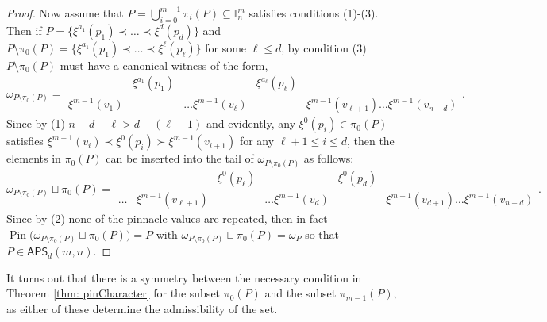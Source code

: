 \documentclass[12pt,reqno]{amsart}
\numberwithin{equation}{section}
\theoremstyle{plain}
\theoremstyle{definition}
\theoremstyle{remark}
\newcommand{\I}{\mathbb{I}}
\newcommand{\Pin}{\operatorname{Pin}}
\newcommand\APS{\mathsf{APS}}
\begin{document}
\begin{proof}
Now assume that $P=\bigcup_{i=0}^{m-1}\pi_i(P) \subseteq \I_n^m$ satisfies conditions (1)-(3).
Then if $P = \{ \xi^{a_1}(p_1)\prec \dots \prec \xi^{d}(p_d)\}$ and $P\setminus \pi_0(P) = \{ \xi^{a_1}(p_1)\prec \dots \prec \xi^{\ell}(p_{\ell})\}$ for some $\ell\leq d$, by condition (3) $P\setminus \pi_0(P)$ must have a canonical witness of the form, 
\begin{equation}\label{eq:smallwitness} 
\omega_{P\setminus\pi_0(P)}=\begin{matrix}&\xi^{a_1}(p_1)&&\xi^{a_\ell}(p_{\ell})\\
\xi^{m-1}(v_1)&& \dots \xi^{m-1}(v_{\ell})&& \xi^{m-1}(v_{\ell+1})\dots \xi^{m-1}(v_{n-d})
\end{matrix}. 
\end{equation}
Since by (1) $n-d-\ell > d-(\ell-1)$ and evidently, any $\xi^0(p_i) \in \pi_0(P)$ satisfies $\xi^{m-1}(v_i) \prec \xi^0(p_i) \succ \xi^{m-1}(v_{i+1})$ for any $\ell+1\leq i \leq d$, then the elements in $\pi_0(P)$ can be inserted into the tail of $\omega_{P\setminus\pi_0(P)}$ as follows: 
\begin{equation*}
\omega_{P\setminus\pi_0(P)}\sqcup \pi_0(P)=\begin{matrix}&&\xi^{0}(p_\ell)&&\xi^{0}(p_{d})
\\
\dots&\xi^{m-1}(v_{\ell+1})&& \dots \xi^{m-1}(v_{d})&& \xi^{m-1}(v_{d+1})\dots \xi^{m-1}(v_{n-d})
\end{matrix}. 
\end{equation*}
Since by (2) none of the pinnacle values are repeated, then in fact $\Pin\Big(\omega_{P\setminus\pi_0(P)}\sqcup \pi_0(P)\Big) =P$ with
$\omega_{P\setminus\pi_0(P)}\sqcup \pi_0(P) = \omega_P$ so that $P \in \APS_d(m,n)$.


\end{proof}

It turns out that there is a symmetry between the necessary condition in Theorem \ref{thm: pinCharacter} for the subset $\pi_0(P)$ and the subset $\pi_{m-1}(P)$, as either of these determine the admissibility of the set.
\end{document}
